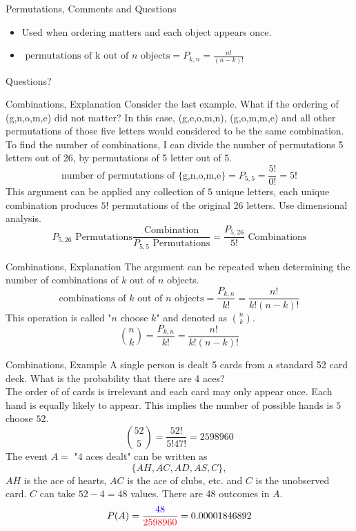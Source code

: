 \documentclass[]{beamer}
\newcommand{\blue}[1]{{\color{blue} #1}}
\newcommand{\red}[1]{{\color{red} #1}}
\newcommand{\qtns}[0]{\begin{center} Questions? \end{center}}
\newcommand{\nl}[1]{\vspace{#1 em}}
\begin{document}
\begin{frame}{Permutations, Comments and Questions}
    \begin{itemize}
        \item Used when ordering matters and each object appears once.
        \item $\text{ permutations of } $k$ \text{ out of } n \text{ objects} = P_{k,n} = \frac{n!}{(n-k)!}$
    \end{itemize}
    \qtns
\end{frame}

\begin{frame}{Combinations, Explanation}
    Consider the last example. What if the ordering of (g,n,o,m,e) did not matter? \pause In this case, (g,e,o,m,n), (g,o,m,m,e) and all other permutations of those five letters would considered to be the same combination. To find the number of combinations, I can divide the number of permutations 5 letters out of 26, by permutations of 5 letter out of 5.
    \[\text{number of permutations of \{g,n,o,m,e\} } = P_{5,5} = \frac{5!}{0!} = 5!\]
    \pause This argument can be applied any collection of $5$ unique letters, each unique combination produces $5!$ permutations of the original 26 letters. Use dimensional analysis.
    \[P_{5,26} \text{ Permutations} \frac{\text{Combination}}{P_{5,5} \text{ Permutations}} = \frac{P_{5,26}}{5!} \text{ Combinations}\]
\end{frame}

\begin{frame}{Combinations, Explanation}
    The argument can be repeated when determining the number of combinations of $k$ out of $n$ objects.
    \\
    \nl{0.5}
    \[\text{combinations of } k \text{ out of } n \text{ objects} = \frac{P_{k,n}}{k!} = \frac{n!}{k!(n-k)!}\]
    This operation is called "$n$ choose $k$" and denoted as $\binom{n}{k}$.
    \[\binom{n}{k} = \frac{P_{k,n}}{k!} = \frac{n!}{k!(n-k)!}\]
\end{frame}

\begin{frame}{Combinations, Example}
    A single person is dealt 5 cards from a standard 52 card deck. What is the probability that there are 4 aces?\\
    \nl{0.5}
    \pause The order of of cards is irrelevant and each card may only appear once. Each hand is equally likely to appear. This implies the \red{number of possible hands is $5$ choose $52$}.
    \[\binom{52}{5} = \frac{52!}{5!47!} = 2598960\]
    \pause The event $A =$ "4 aces dealt" can be written as 
    \[\{ AH, AC,AD,AS, C \},\]
    $AH$ is the ace of hearts, $AC$ is the ace of clubs, etc. and $C$ is the unobserved card. $C$ can take $52-4 = 48$ values. \pause There are \blue{48 outcomes in $A$}.
    \[P(A) = \frac{\blue{48}}{\red{2598960}} = 0.00001846892\]
\end{frame}
\end{document}
